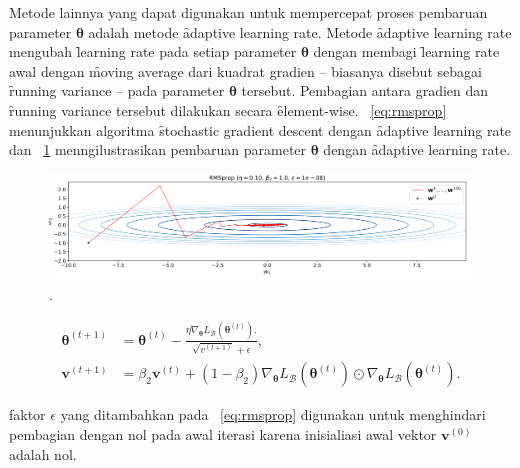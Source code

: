     Metode lainnya yang dapat digunakan untuk mempercepat proses pembaruan parameter $\bm{\theta}$ adalah metode \f{adaptive learning rate}. Metode \f{adaptive learning rate} mengubah \f{learning rate} pada setiap parameter $\bm{\theta}$ dengan membagi \f{learning rate} awal dengan \f{moving average} dari kuadrat gradien -- biasanya disebut sebagai \f{running variance} -- pada parameter $\bm{\theta}$ tersebut. Pembagian antara gradien dan \f{running variance} tersebut dilakukan secara \f{element-wise}. \equ~\ref{eq:rmsprop} menunjukkan algoritma \f{stochastic gradient descent} dengan \f{adaptive learning rate} dan \pic~\ref{fig:rmsprop} menngilustrasikan pembaruan parameter $\bm{\theta}$ dengan \f{adaptive learning rate}.
\begin{figure}
    \centering
    \includegraphics[width=1\textwidth]{assets/pics/RMSPROP.png}
    \caption{\license.}
    \label{fig:rmsprop}
\end{figure}
\begin{align}
    \label{eq:rmsprop}
    \bm{\theta}^{(t+1)} &= \bm{\theta}^{(t)} - \frac{\eta \nabla_{\bm{\theta}} L_{\mathcal{B}}(\bm{\theta}^{(t)}).}{\sqrt{v^{(t+1)}} + \epsilon}, \\
    \bm{v}^{(t+1)} &= \beta_2 \bm{v}^{(t)} + (1 - \beta_2) \nabla_{\bm{\theta}} L_{\mathcal{B}}(\bm{\theta}^{(t)})\odot \nabla_{\bm{\theta}} L_{\mathcal{B}}(\bm{\theta}^{(t)}).
\end{align}

faktor $\epsilon$ yang ditambahkan pada \equ~\ref{eq:rmsprop} digunakan untuk menghindari pembagian dengan nol pada awal iterasi karena inisialiasi awal vektor $\bm{v}^{(0)}$ adalah nol.

